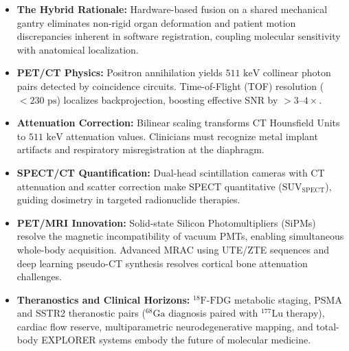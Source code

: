 \documentclass[11pt,a4paper]{article}
\begin{document}
\begin{itemize}[leftmargin=2em]
    \item \textbf{The Hybrid Rationale:} Hardware-based fusion on a shared mechanical gantry eliminates non-rigid organ deformation and patient motion discrepancies inherent in software registration, coupling molecular sensitivity with anatomical localization.
    \item \textbf{PET/CT Physics:} Positron annihilation yields $511\text{ keV}$ collinear photon pairs detected by coincidence circuits. Time-of-Flight (TOF) resolution ($< 230\text{ ps}$) localizes backprojection, boosting effective SNR by $> 3\text{--}4\times$.
    \item \textbf{Attenuation Correction:} Bilinear scaling transforms CT Hounsfield Units to $511\text{ keV}$ attenuation values. Clinicians must recognize metal implant artifacts and respiratory misregistration at the diaphragm.
    \item \textbf{SPECT/CT Quantification:} Dual-head scintillation cameras with CT attenuation and scatter correction make SPECT quantitative ($\text{SUV}_{\text{SPECT}}$), guiding dosimetry in targeted radionuclide therapies.
    \item \textbf{PET/MRI Innovation:} Solid-state Silicon Photomultipliers (SiPMs) resolve the magnetic incompatibility of vacuum PMTs, enabling simultaneous whole-body acquisition. Advanced MRAC using UTE/ZTE sequences and deep learning pseudo-CT synthesis resolves cortical bone attenuation challenges.
    \item \textbf{Theranostics and Clinical Horizons:} $^{18}\text{F}\text{-FDG}$ metabolic staging, PSMA and SSTR2 theranostic pairs ($^{68}\text{Ga}$ diagnosis paired with $^{177}\text{Lu}$ therapy), cardiac flow reserve, multiparametric neurodegenerative mapping, and total-body EXPLORER systems embody the future of molecular medicine.
\end{itemize}
\end{document}
